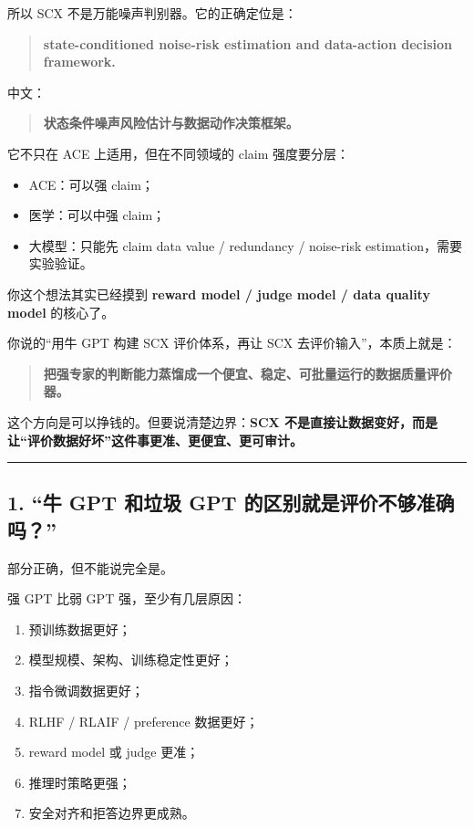 \documentclass[
  12pt,
]{ctexart}
\providecommand{\tightlist}{%
  \setlength{\itemsep}{0pt}\setlength{\parskip}{0pt}}
\begin{document}
所以 SCX 不是万能噪声判别器。它的正确定位是：

\begin{quote}
\textbf{state-conditioned noise-risk estimation and data-action decision
framework.}
\end{quote}

中文：

\begin{quote}
\textbf{状态条件噪声风险估计与数据动作决策框架。}
\end{quote}

它不只在 ACE 上适用，但在不同领域的 claim 强度要分层：

\begin{itemize}
\tightlist
\item
  ACE：可以强 claim；
\item
  医学：可以中强 claim；
\item
  大模型：只能先 claim data value / redundancy / noise-risk
  estimation，需要实验验证。
\end{itemize}

你这个想法其实已经摸到 \textbf{reward model / judge model / data quality
model} 的核心了。

你说的``用牛 GPT 构建 SCX 评价体系，再让 SCX 去评价输入''，本质上就是：

\begin{quote}
\textbf{把强专家的判断能力蒸馏成一个便宜、稳定、可批量运行的数据质量评价器。}
\end{quote}

这个方向是可以挣钱的。但要说清楚边界：\textbf{SCX
不是直接让数据变好，而是让``评价数据好坏''这件事更准、更便宜、更可审计。}

\begin{center}\rule{0.5\linewidth}{0.5pt}\end{center}

\subsection{1. ``牛 GPT 和垃圾 GPT
的区别就是评价不够准确吗？''}\label{ux725b-gpt-ux548cux5783ux573e-gpt-ux7684ux533aux522bux5c31ux662fux8bc4ux4ef7ux4e0dux591fux51c6ux786eux5417}

部分正确，但不能说完全是。

强 GPT 比弱 GPT 强，至少有几层原因：

\begin{enumerate}
\def\labelenumi{\arabic{enumi}.}
\tightlist
\item
  预训练数据更好；
\item
  模型规模、架构、训练稳定性更好；
\item
  指令微调数据更好；
\item
  RLHF / RLAIF / preference 数据更好；
\item
  reward model 或 judge 更准；
\item
  推理时策略更强；
\item
  安全对齐和拒答边界更成熟。
\end{enumerate}
\end{document}
